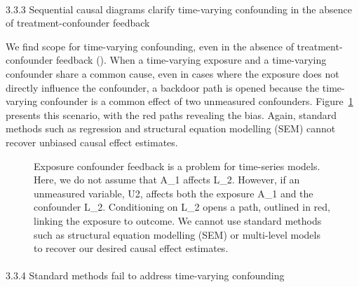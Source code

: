 \documentclass[
  singlecolumn]{article}
\makeatletter
\let\oldparagraph\paragraph
\renewcommand{\paragraph}{
    \@ifstar
      \xxxParagraphStar
      \xxxParagraphNoStar
  }
\newcommand{\xxxParagraphStar}[1]{\oldparagraph*{#1}\mbox{}}
\newcommand{\xxxParagraphNoStar}[1]{\oldparagraph{#1}\mbox{}}
\makeatother
\begin{document}
\paragraph{3.3.3 Sequential causal diagrams clarify time-varying
confounding in the absence of treatment-confounder
feedback}\label{sequential-causal-diagrams-clarify-time-varying-confounding-in-the-absence-of-treatment-confounder-feedback}

We find scope for time-varying confounding, even in the absence of
treatment-confounder feedback (). When a time-varying exposure and a time-varying
confounder share a common cause, even in cases where the exposure does
not directly influence the confounder, a backdoor path is opened because
the time-varying confounder is a common effect of two unmeasured
confounders. Figure~\ref{fig-dag-time-vary-common-cause-A1-l1} presents
this scenario, with the red paths revealing the bias. Again, standard
methods such as regression and structural equation modelling (SEM)
cannot recover unbiased causal effect estimates.

\begin{figure}


\caption{\label{fig-dag-time-vary-common-cause-A1-l1}Exposure confounder
feedback is a problem for time-series models. Here, we do not assume
that A\_1 affects L\_2. However, if an unmeasured variable, U2, affects
both the exposure A\_1 and the confounder L\_2. Conditioning on L\_2
opens a path, outlined in red, linking the exposure to outcome. We
cannot use standard methods such as structural equation modelling (SEM)
or multi-level models to recover our desired causal effect estimates.}

\end{figure}%

\paragraph{3.3.4 Standard methods fail to address time-varying
confounding}\label{standard-methods-fail-to-address-time-varying-confounding}
\end{document}
